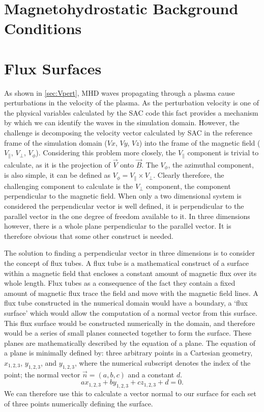 \section{Magnetohydrostatic Background Conditions}\label{sec:mhsbackground}

\section{Flux Surfaces}\label{sec:fluxsurfaces}

As shown in \cref{sec:Vpert}, MHD waves propagating through a plasma cause perturbations in the velocity of the plasma.
As the perturbation velocity is one of the physical variables calculated by the SAC code this fact provides a mechanism by which we can identify the waves in the simulation domain.
However, the challenge is decomposing the velocity vector calculated by SAC in the reference frame of the simulation domain ($Vx$, $Vy$, $Vz$) into the frame of the magnetic field ($V_\parallel$, $V_\perp$, $V_\phi$).
Considering this problem more closely, the $V_\parallel$ component is trivial to calculate, as it is the projection of $\vec{V}$ onto $\vec{B}$.
The $V_\phi$, the azimuthal component, is also simple, it can be defined as $V_\phi = V_\parallel \times V_\perp$.
Clearly therefore, the challenging component to calculate is the $V_\perp$ component, the component perpendicular to the magnetic field.
When only a two dimensional system is considered the perpendicular vector is well defined, it is perpendicular to the parallel vector in the one degree of freedom available to it.
In three dimensions however, there is a whole plane perpendicular to the parallel vector.
It is therefore obvious that some other construct is needed.

The solution to finding a perpendicular vector in three dimensions is to consider the concept of flux tubes.
A flux tube is a mathematical construct of a surface within a magnetic field that encloses a constant amount of magnetic flux over its whole length.
Flux tubes as a consequence of the fact they contain a fixed amount of magnetic flux trace the field and move with the magnetic field lines.
A flux tube constructed in the numerical domain would have a boundary, a `flux surface' which would allow the computation of a normal vector from this surface.
This flux surface would be constructed numerically in the domain, and therefore would be a series of small planes connected together to form the surface.
These planes are mathematically described by the equation of a plane.
The equation of a plane is minimally defined by: three arbitrary points in a Cartesian geometry, $x_{1,2,3}$, $y_{1,2,3}$, and $y_{1,2,3}$, where the numerical subscript denotes the index of the point; the normal vector $\vec{n}=(a,b,c)$ and a constant $d$.
\begin{equation}
	ax_{1,2,3}+by_{1,2,3}+cz_{1,2,3}+d=0.
\end{equation}
We can therefore use this to calculate a vector normal to our surface for each set of three points numerically defining the surface.

